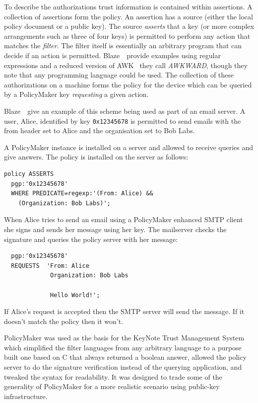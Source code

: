 \documentclass[thesis.tex]{subfiles}
\begin{document}
To describe the authorizations trust information is contained within
assertions.  A collection of assertions form the policy.  An assertion
has a source (either the local policy document or a public key). The
source \emph{asserts} that a key (or more complex arrangements such as
three of four keys) is permitted to perform any action that matches
the \emph{filter}.  The filter itself is essentially an arbitrary
program that can decide if an action is permitted.
Blaze~\etal~provide examples using regular expressions and a reduced
version of AWK~\cite{aho_awk-pattern_1979} they call \emph{AWKWARD},
though they note that any programming language could be used.  The
collection of these authorizations on a machine forms the policy for
the device which can be queried by a PolicyMaker key \emph{requesting}
a given action.

Blaze~\etal~give an example of this scheme being used as part of an
email server.  A user, Alice, identified by key \texttt{0x12345678} is
permitted to send emails with the from header set to Alice and the
organisation set to Bob Labs.

A PolicyMaker instance is installed on a server and allowed to receive queries and give answers.
The policy is installed on the server as follows:

\begin{lstlisting}
policy ASSERTS
  pgp:'0x12345678'
  WHERE PREDICATE=regexp:'(From: Alice) &&
    (Organization: Bob Labs)';
\end{lstlisting}

When Alice tries to send an email using a PolicyMaker enhanced SMTP
client she signs and sends her message using her key.  The mailserver
checks the signature and queries the policy server with her message:

\begin{lstlisting}
  pgp:'0x12345678'
  REQUESTS  'From: Alice
             Organization: Bob Labs

             Hello World!';
\end{lstlisting}

If Alice's request is accepted then the SMTP server will send the
message.  If it doesn't match the policy then it won't.

PolicyMaker was used as the basis for the KeyNote Trust Management
System~\cite{blaze_role_1999,blaze_keynote:_1998} which simplified the
filter languages from any arbitrary language to a purpose built one
based on C that always returned a boolean answer, allowed the policy
server to do the signature verification instead of the querying
application, and tweaked the syntax for readability.  It was designed
to trade some of the generality of PolicyMaker for a more realistic
scenario using public-key infrastructure.
\end{document}
